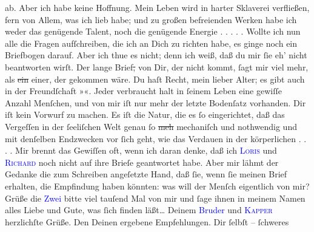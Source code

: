\documentclass[twoside=false,titlepage=false,open=any, parskip=never, fontsize=12pt, headings=small, chapterprefix=false, appendixprefix=false]{scrbook}
\newcommand{\strikeout}[1]{\sout{#1}}
\newcommand{\dotsfive}{%
.\kern\ellipsisgap 
.\kern\ellipsisgap
.\kern\ellipsisgap
.\kern\ellipsisgap 
.\kern\ellipsisgap 
\relax}
\newcommand{\dotsfour}{%
.\kern\ellipsisgap 
.\kern\ellipsisgap
.\kern\ellipsisgap
.\kern\ellipsisgap 
\relax}
\newcommand{\pbposition}{\depth}
\newcommand{\pb}{\nobreak\hspace{0pt}\raisebox{-0.1em}{\raisebox{\pbposition}{\textnormal{|}}}\nobreak\hspace{0pt}}
\begin{document}
               ab. Aber ich habe keine Hoffnung. Mein Leben wird in harter Sklaverei verfließen,
               fern von Allem, was ich lieb habe; und zu großen befreienden Werken habe ich weder
               das genügende Talent, noch die genügende Energie{\dotsfive}\pend
           \pstart
           Wollte ich nun alle die Fragen aufſchreiben, die ich an Dich zu richten habe, es
               ginge noch ein Briefbogen darauf. Aber ich thue es nicht; denn ich weiß, daß du mir
               ſie eh’ nicht beantworten wirſt. Der lange Brief\strikeout{,} von
               Dir, der nicht kommt, ſagt mir viel mehr, als \strikeout{ein}
               einer, der gekom{\pb}men wäre. Du haſt Recht, mein
               lieber Alter; es gibt auch in der Freundſchaft »\label{K_L02669-45v}\label{K_L02669-45h}«. Jeder verbraucht halt in ſeinem Leben eine gewiſſe Anzahl Menſchen, und von
               mir iſt nur mehr der letzte Bodenſatz vorhanden. Dir iſt kein Vorwurf zu machen. Es
               iſt die Natur, die es ſo eingerichtet, daß das Vergeſſen in der ſeeliſchen Welt genau
               ſo \strikeout{meh} mechaniſch und nothwendig und mit denſelben
               Endzwecken vor ſich geht, wie das Verdauen in der körperlichen{\dotsfour}\pend
           \pstart
           Mir brennt das Gewiſſen oft, wenn ich daran denke, daß ich \textsc{\textcolor{blue}{Loris}{}\ledrightnote{\textcolor{blue}{Hugo von Hofmannsthal}}} und \textsc{\textcolor{blue}{Richard}{}\ledrightnote{\textcolor{blue}{Richard Beer-Hofmann}}} noch nicht auf ihre Brieſe geantwortet habe. Aber mir lähmt der Gedanke die zum
               Schreiben angeſetzte Hand, daß ſie, wenn ſie meinen Brief erhalten, die Empfindung
               haben könnten: was will der Menſch eigentlich von mir? Grüße die \textcolor{blue}{Zwei}{} bitte viel {\pb}tauſend Mal von mir und ſage ihnen in meinem Namen
               alles Liebe und Gute, was ſich finden läßt{\dots}\pend
           \pstart
           Deinem \textcolor{blue}{Bruder}{} und \textsc{\textcolor{blue}{Kapper}{}\ledrightnote{\textcolor{blue}{Friedrich Kapper}}} herzlichſte Grüße. Den Deinen ergebene Empfehlungen. Dir ſelbſt – ſchweres
\end{document}
